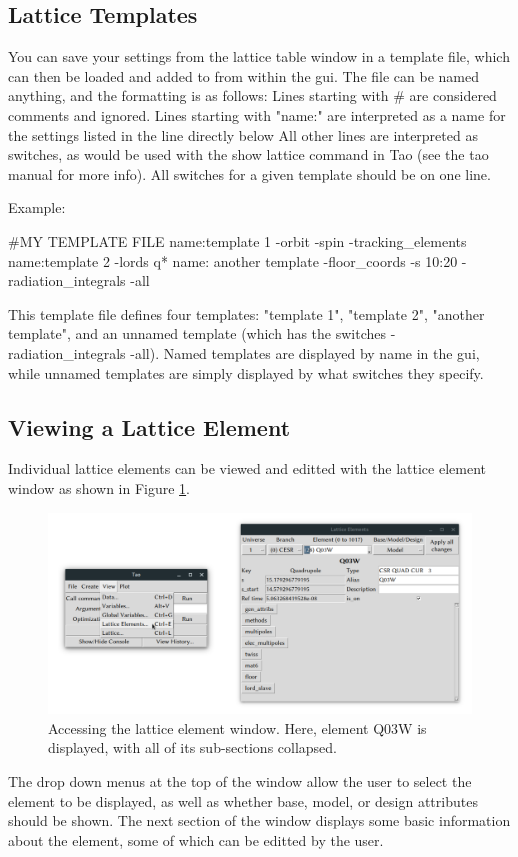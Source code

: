 \subsection{Lattice Templates}
\label{s:gui.lat.templates}

You can save your settings from the lattice table window in a template file, which can then be loaded and added to from within the gui.
The file can be named anything, and the formatting is as follows:
Lines starting with \# are considered comments and ignored.
Lines starting with "name:" are interpreted as a name for the settings listed in the line directly below
All other lines are interpreted as switches, as would be used with the show lattice command in Tao (see the tao manual for more info).
All switches for a given template should be on one line.

Example:
\begin{example}
#MY TEMPLATE FILE
name:template 1
-orbit -spin -tracking_elements
name:template 2
-lords q*
name: another template
-floor_coords -s 10:20
-radiation_integrals -all
\end{example}

This template file defines four templates: "template 1", "template 2", "another template", and an unnamed template (which has the switches -radiation_integrals -all).  Named templates are displayed by name in the gui, while unnamed templates are simply displayed by what switches they specify.

\subsection{Viewing a Lattice Element}
\label{s:gui.lat.elements}

Individual lattice elements can be viewed and editted with the lattice element window as shown in Figure \ref{fig:gui.lat.element.1}.
\begin{figure}
\centering
\includegraphics[width=12cm]{figures/lat_element_1.pdf}
\caption[Accessing the lattice element window.]{Accessing the lattice element window.
Here, element Q03W is displayed, with all of its sub-sections collapsed.}
\label{fig:gui.lat.element.1}
\end{figure}
The drop down menus at the top of the window allow the user to select the element to be displayed, as well as whether base, model, or design attributes should be shown.
The next section of the window displays some basic information about the element, some of which can be editted by the user.

